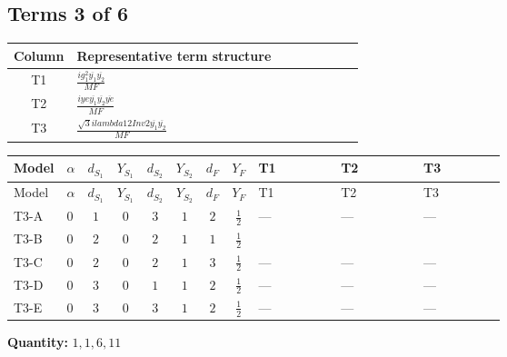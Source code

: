 \documentclass[8pt]{article}
\begin{document}
\begin{landscape}
\subsection*{Terms 3 of 6}
\begin{center}
\begin{tabular}{@{}c >{\raggedright\arraybackslash}p{0.82\linewidth}@{}}
\toprule
Column & Representative term structure \\
\midrule
T1 & \(\displaystyle \frac{i g_{1}^{2} \overline{y_{1}} \overline{y_{2}}}{MF}\) \\
\midrule
T2 & \(\displaystyle \frac{i ye \overline{y_{1}} \overline{y_{2}} \overline{ye}}{MF}\) \\
\midrule
T3 & \(\displaystyle \frac{\sqrt{3} i lambda12Inv2 \overline{y_{1}} \overline{y_{2}}}{MF}\) \\
\midrule
\bottomrule
\end{tabular}
\end{center}
\smallskip
\tiny
\begin{longtable}{@{}llcccccc >{\raggedright\arraybackslash}p{0.21\linewidth} >{\raggedright\arraybackslash}p{0.21\linewidth} >{\raggedright\arraybackslash}p{0.21\linewidth}@{}}
\toprule
Model & $\alpha$ & $d_{S_1}$ & $Y_{S_1}$ & $d_{S_2}$ & $Y_{S_2}$ & $d_F$ & $Y_F$ & T1 & T2 & T3 \\
\midrule
\endfirsthead
\toprule
Model & $\alpha$ & $d_{S_1}$ & $Y_{S_1}$ & $d_{S_2}$ & $Y_{S_2}$ & $d_F$ & $Y_F$ & T1 & T2 & T3 \\
\midrule
\endhead
T3-A & $0$ & $1$ & $0$ & $3$ & $1$ & $2$ & $\frac{1}{2}$ & --- & --- & --- \\
\midrule
T3-B & $0$ & $2$ & $0$ & $2$ & $1$ & $1$ & $\frac{1}{2}$ & \scriptsize\adjustbox{max width=\linewidth}{$\begin{gathered} \frac{3 i g_{1}^{2} \overline{y_{1}} \overline{y_{2}}}{8 MF}\end{gathered}$} & \scriptsize\adjustbox{max width=\linewidth}{$\begin{gathered} - \frac{i ye \overline{y_{1}} \overline{y_{2}} \overline{ye}}{4 MF}\end{gathered}$} & \scriptsize\adjustbox{max width=\linewidth}{$\begin{gathered} \frac{\sqrt{3} i lambda12Inv2 \overline{y_{1}} \overline{y_{2}}}{3 MF}\end{gathered}$} \\
\midrule
T3-C & $0$ & $2$ & $0$ & $2$ & $1$ & $3$ & $\frac{1}{2}$ & --- & --- & --- \\
\midrule
T3-D & $0$ & $3$ & $0$ & $1$ & $1$ & $2$ & $\frac{1}{2}$ & --- & --- & --- \\
\midrule
T3-E & $0$ & $3$ & $0$ & $3$ & $1$ & $2$ & $\frac{1}{2}$ & --- & --- & --- \\
\midrule
\bottomrule
\end{longtable}
\clearpage
\noindent\textbf{Quantity: }$\mathrm{1,1,6,11}$\par\smallskip

\end{landscape}
\end{document}
